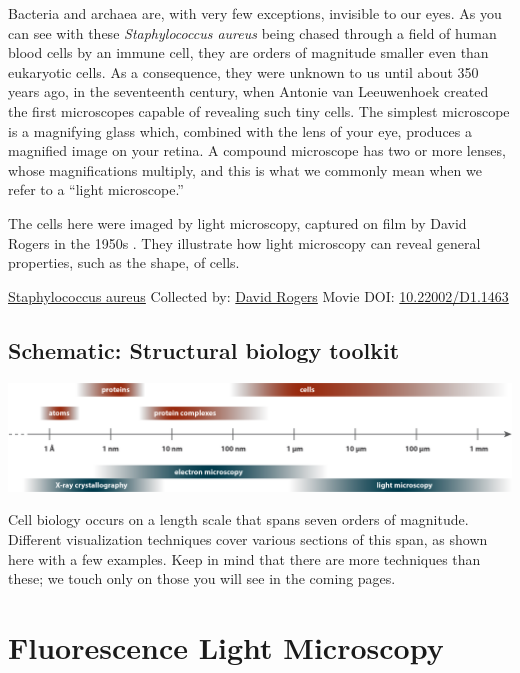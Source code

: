 \documentclass[]{tufte-book}
\begin{document}
Bacteria and archaea are, with very few exceptions, invisible to our eyes. As you can see with these \emph{Staphylococcus aureus} being chased through a field of human blood cells by an immune cell, they are orders of magnitude smaller even than eukaryotic cells. As a consequence, they were unknown to us until about 350 years ago, in the seventeenth century, when Antonie van Leeuwenhoek created the first microscopes capable of revealing such tiny cells. The simplest microscope is a magnifying glass which, combined with the lens of your eye, produces a magnified image on your retina. A compound microscope has two or more lenses, whose magnifications multiply, and this is what we commonly mean when we refer to a ``light microscope.''

The cells here were imaged by light microscopy, captured on film by David Rogers in the 1950s \citep{hillInternet}. They illustrate how light microscopy can reveal general properties, such as the shape, of cells.



\hypertarget{htmlwidget-ba5d07a9ede77579ce05}{}

\label{fig:1-1}\protect\hyperlink{tree}{Staphylococcus aureus} Collected by: \protect\hyperlink{david_rogers}{David Rogers} Movie DOI: \href{https://doi.org/10.22002/D1.1463}{10.22002/D1.1463}

\hypertarget{Structural_biology_toolkit}{%
\subsection*{Schematic: Structural biology toolkit}\label{Structural_biology_toolkit}}

\includegraphics[width=38.54in]{img/schematics/1_1_1}

Cell biology occurs on a length scale that spans seven orders of magnitude. Different visualization techniques cover various sections of this span, as shown here with a few examples. Keep in mind that there are more techniques than these; we touch only on those you will see in the coming pages.

\hypertarget{fluorescence-light-microscopy}{%
\section{Fluorescence Light Microscopy}\label{fluorescence-light-microscopy}}
\end{document}

